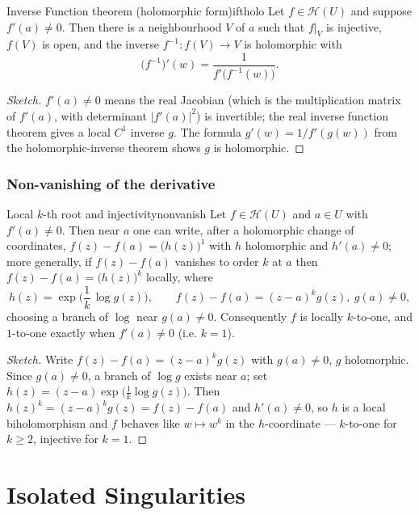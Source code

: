\documentclass[11pt,openany]{report}
\newcommand{\abs}[1]{\left\lvert #1 \right\rvert}
\newcommand{\Hol}{\mathcal{H}}
\begin{document}
\begin{theorem}{Inverse Function theorem (holomorphic form)}{iftholo}
Let $f\in\Hol(U)$ and suppose $f'(a)\ne0$. Then there is a neighbourhood $V$ of $a$ such
that $f|_V$ is injective, $f(V)$ is open, and the inverse $f^{-1}:f(V)\to V$ is holomorphic
with
\[
  \bigl(f^{-1}\bigr)'(w) = \frac{1}{f'\!\bigl(f^{-1}(w)\bigr)}.
\]
\end{theorem}

\begin{proof}[Sketch]
$f'(a)\ne0$ means the real Jacobian (which is the multiplication matrix of $f'(a)$, with
determinant $\abs{f'(a)}^2$) is invertible; the real inverse function theorem gives a local
$C^1$ inverse $g$. The formula $g'(w)=1/f'(g(w))$ from the holomorphic-inverse theorem shows
$g$ is holomorphic.
\end{proof}

\subsection{Non-vanishing of the derivative}

\begin{theorem}{Local $k$-th root and injectivity}{nonvanish}
Let $f\in\Hol(U)$ and $a\in U$ with $f'(a)\ne0$. Then near $a$ one can write, after a
holomorphic change of coordinates, $f(z)-f(a)=\bigl(h(z)\bigr)^{1}$ with $h$ holomorphic and
$h'(a)\ne0$; more generally, if $f(z)-f(a)$ vanishes to order $k$ at $a$ then
$f(z)-f(a)=\bigl(h(z)\bigr)^{k}$ locally, where
\[
  h(z) = \exp\!\Big(\frac1k\,\log g(z)\Big), \qquad f(z)-f(a) = (z-a)^k g(z),\ g(a)\ne0,
\]
choosing a branch of $\log$ near $g(a)\ne0$. Consequently $f$ is locally $k$-to-one, and
$1$-to-one exactly when $f'(a)\ne0$ (i.e. $k=1$).
\end{theorem}

\begin{proof}[Sketch]
Write $f(z)-f(a)=(z-a)^k g(z)$ with $g(a)\ne0$, $g$ holomorphic. Since $g(a)\ne0$, a branch
of $\log g$ exists near $a$; set $h(z)=(z-a)\exp\bigl(\tfrac1k\log g(z)\bigr)$. Then
$h(z)^k=(z-a)^k g(z)=f(z)-f(a)$ and $h'(a)\ne0$, so $h$ is a local biholomorphism and $f$
behaves like $w\mapsto w^k$ in the $h$-coordinate --- $k$-to-one for $k\ge2$, injective for
$k=1$.
\end{proof}


\chapter{Isolated Singularities}
\end{document}
